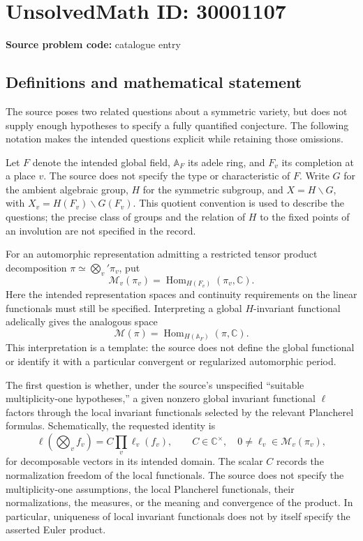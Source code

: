 \documentclass[11pt]{article}
\begin{document}
\section*{UnsolvedMath ID: 30001107}
\textbf{Source problem code:} catalogue entry
\subsection{Definitions and mathematical statement}
The source poses two related questions about a symmetric variety, but does not supply enough hypotheses to specify a fully quantified conjecture. The following notation makes the intended questions explicit while retaining those omissions.

Let \(F\) denote the intended global field, \(\mathbb A_F\) its adele ring, and \(F_v\) its completion at a place \(v\). The source does not specify the type or characteristic of \(F\). Write \(G\) for the ambient algebraic group, \(H\) for the symmetric subgroup, and \(X=H\backslash G\), with \(X_v=H(F_v)\backslash G(F_v)\). This quotient convention is used to describe the questions; the precise class of groups and the relation of \(H\) to the fixed points of an involution are not specified in the record.

For an automorphic representation admitting a restricted tensor product decomposition \(\pi\simeq\bigotimes_v'\pi_v\), put
\[
\mathcal M_v(\pi_v)=\operatorname{Hom}_{H(F_v)}(\pi_v,\mathbb C).
\]
Here the intended representation spaces and continuity requirements on the linear functionals must still be specified. Interpreting a global \(H\)-invariant functional adelically gives the analogous space
\[
\mathcal M(\pi)=\operatorname{Hom}_{H(\mathbb A_F)}(\pi,\mathbb C).
\]
This interpretation is a template: the source does not define the global functional or identify it with a particular convergent or regularized automorphic period.

The first question is whether, under the source's unspecified ``suitable multiplicity-one hypotheses,'' a given nonzero global invariant functional \(\ell\) factors through the local invariant functionals selected by the relevant Plancherel formulas. Schematically, the requested identity is
\[
\ell\!\left(\bigotimes_v f_v\right)
 = C\prod_v\ell_v(f_v),
\qquad
C\in\mathbb C^\times,
\quad 0\ne\ell_v\in\mathcal M_v(\pi_v),
\]
for decomposable vectors in its intended domain. The scalar \(C\) records the normalization freedom of the local functionals. The source does not specify the multiplicity-one assumptions, the local Plancherel functionals, their normalizations, the measures, or the meaning and convergence of the product. In particular, uniqueness of local invariant functionals does not by itself specify the asserted Euler product.
\end{document}
